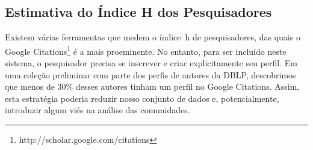 \subsection{Estimativa do Índice H dos Pesquisadores}\label{sub:hindex}

Existem várias ferramentas que medem o índice~h de pesquisadores, das quais o Google 
Citations\footnote{http://scholar.google.com/citations} é a mais proeminente. No entanto, 
para ser incluído neste sistema, o pesquisador precisa se inscrever e criar explicitamente 
seu perfil. Em uma coleção preliminar com parte dos perfis de autores da DBLP, descobrimos 
que menos de 30\% desses autores tinham um perfil no Google Citations. Assim, esta estratégia 
poderia reduzir nosso conjunto de dados e, potencialmente, introduzir algum viés na análise 
das comunidades.

